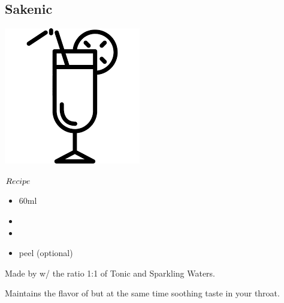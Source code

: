 \subsection{Sakenic}
\vspace{-7.6mm}
\hspace{30mm}
\includegraphics[scale=.07]{cocktail_glass_tall.png}
\vspace{2.5mm}
\begin{itembox}[l]{\boldmath $Recipe$}
\begin{itemize}
\setlength{\parskip}{0cm}
\setlength{\itemsep}{0cm}
\item \sake 60ml
\item \tw
\item \soda
\item \orange peel (optional)
\end{itemize}
\vspace{-4mm}
Made by \build w/ the ratio 1:1 of Tonic and Sparkling Waters.
\end{itembox}
Maintains the flavor of \sake but at the same time soothing taste in your throat.
